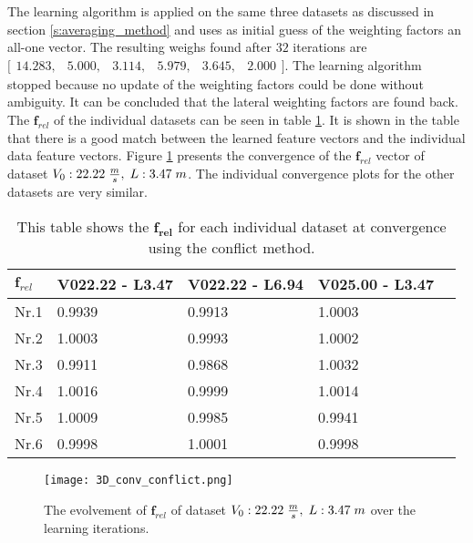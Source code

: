 The learning algorithm is applied on the same three datasets as discussed in section \ref{s:averaging_method} and uses as initial guess of the weighting factors an all-one vector. The resulting weighs found after $32$ iterations are  $\bigl[ \begin{smallmatrix} 14.283,&5.000,&3.114,&5.979,&3.645,&2.000\end{smallmatrix}\bigr]$. The learning algorithm stopped because no update of the weighting factors could be done without ambiguity. It can be concluded that the lateral weighting factors are found back. The $\bm{f}_{rel}$ of the individual datasets can be seen in table \ref{tab:in_conflict}. It is shown in the table that there is a good match between the learned feature vectors and the individual data feature vectors. Figure \ref{fig:3D_conv_conflict} presents the convergence of the $\bm{f}_{rel}$ vector of dataset $V_0:22.22\hspace{1mm}\frac{m}{s},\hspace{1mm} L:3.47\hspace{1mm}m$. The individual convergence plots for the other datasets are very similar.\\

\begin{table}[h!]
	\centering
	\begin{tabular}{@{}llllr@{}} \toprule
		$\bm{f}_{rel}$    & V022.22 - L3.47 & V022.22 - L6.94 & V025.00 - L3.47\\ \midrule
		Nr.1       		  &0.9939       & 0.9913 	    & 1.0003 		\\
		Nr.2              & 1.0003       & 0.9993       & 1.0002       \\
		Nr.3              & 0.9911       & 0.9868       & 1.0032      \\
		Nr.4              & 1.0016       & 0.9999       & 1.0014       \\
		Nr.5              & 1.0009       & 0.9985       & 0.9941       \\
		Nr.6              & 0.9998       & 1.0001       & 0.9998       \\ \bottomrule
	\end{tabular}
	\caption{This table shows the $\bm{f_{rel}}$ for each individual dataset at convergence using the conflict method.}
	\label{tab:in_conflict}
\end{table} 


\begin{figure}[h!]
	\centering
	\texttt{[image: 3D\_conv\_conflict.png]}
	\caption{The evolvement of $\bm{f}_{rel}$ of dataset  $V_0:22.22\hspace{1mm}\frac{m}{s},\hspace{1mm} L:3.47\hspace{1mm}m$ over the learning iterations.}
	\label{fig:3D_conv_conflict}
\end{figure}

